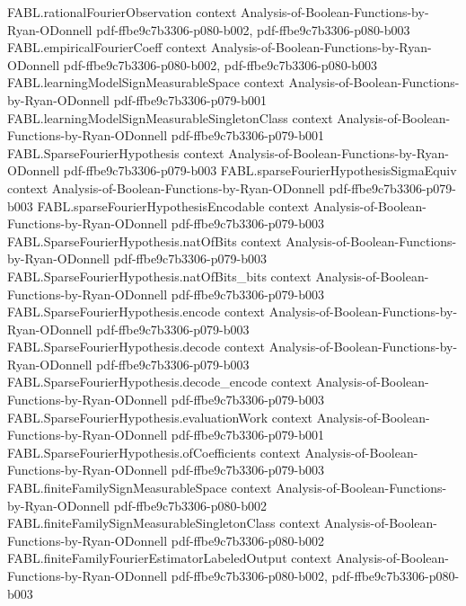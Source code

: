 \begin{theorem}
\proofstep
  {FABL.rationalFourierObservation}
  {context}
  {Analysis-of-Boolean-Functions-by-Ryan-ODonnell}
  {pdf-ffbe9c7b3306-p080-b002,
    pdf-ffbe9c7b3306-p080-b003}
\proofstep
  {FABL.empiricalFourierCoeff}
  {context}
  {Analysis-of-Boolean-Functions-by-Ryan-ODonnell}
  {pdf-ffbe9c7b3306-p080-b002,
    pdf-ffbe9c7b3306-p080-b003}
\proofstep
  {FABL.learningModelSignMeasurableSpace}
  {context}
  {Analysis-of-Boolean-Functions-by-Ryan-ODonnell}
  {pdf-ffbe9c7b3306-p079-b001}
\proofstep
  {FABL.learningModelSignMeasurableSingletonClass}
  {context}
  {Analysis-of-Boolean-Functions-by-Ryan-ODonnell}
  {pdf-ffbe9c7b3306-p079-b001}
\proofstep
  {FABL.SparseFourierHypothesis}
  {context}
  {Analysis-of-Boolean-Functions-by-Ryan-ODonnell}
  {pdf-ffbe9c7b3306-p079-b003}
\proofstep
  {FABL.sparseFourierHypothesisSigmaEquiv}
  {context}
  {Analysis-of-Boolean-Functions-by-Ryan-ODonnell}
  {pdf-ffbe9c7b3306-p079-b003}
\proofstep
  {FABL.sparseFourierHypothesisEncodable}
  {context}
  {Analysis-of-Boolean-Functions-by-Ryan-ODonnell}
  {pdf-ffbe9c7b3306-p079-b003}
\proofstep
  {FABL.SparseFourierHypothesis.natOfBits}
  {context}
  {Analysis-of-Boolean-Functions-by-Ryan-ODonnell}
  {pdf-ffbe9c7b3306-p079-b003}
\proofstep
  {FABL.SparseFourierHypothesis.natOfBits_bits}
  {context}
  {Analysis-of-Boolean-Functions-by-Ryan-ODonnell}
  {pdf-ffbe9c7b3306-p079-b003}
\proofstep
  {FABL.SparseFourierHypothesis.encode}
  {context}
  {Analysis-of-Boolean-Functions-by-Ryan-ODonnell}
  {pdf-ffbe9c7b3306-p079-b003}
\proofstep
  {FABL.SparseFourierHypothesis.decode}
  {context}
  {Analysis-of-Boolean-Functions-by-Ryan-ODonnell}
  {pdf-ffbe9c7b3306-p079-b003}
\proofstep
  {FABL.SparseFourierHypothesis.decode_encode}
  {context}
  {Analysis-of-Boolean-Functions-by-Ryan-ODonnell}
  {pdf-ffbe9c7b3306-p079-b003}
\proofstep
  {FABL.SparseFourierHypothesis.evaluationWork}
  {context}
  {Analysis-of-Boolean-Functions-by-Ryan-ODonnell}
  {pdf-ffbe9c7b3306-p079-b001}
\proofstep
  {FABL.SparseFourierHypothesis.ofCoefficients}
  {context}
  {Analysis-of-Boolean-Functions-by-Ryan-ODonnell}
  {pdf-ffbe9c7b3306-p079-b003}
\proofstep
  {FABL.finiteFamilySignMeasurableSpace}
  {context}
  {Analysis-of-Boolean-Functions-by-Ryan-ODonnell}
  {pdf-ffbe9c7b3306-p080-b002}
\proofstep
  {FABL.finiteFamilySignMeasurableSingletonClass}
  {context}
  {Analysis-of-Boolean-Functions-by-Ryan-ODonnell}
  {pdf-ffbe9c7b3306-p080-b002}
\proofstep
  {FABL.finiteFamilyFourierEstimatorLabeledOutput}
  {context}
  {Analysis-of-Boolean-Functions-by-Ryan-ODonnell}
  {pdf-ffbe9c7b3306-p080-b002,
    pdf-ffbe9c7b3306-p080-b003}

\end{theorem}
